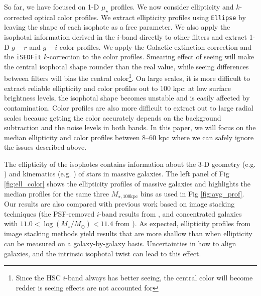 \documentclass[a4paper,fleqn,usenatbib]{mnras}
\def\logms{{$\log (M_{\star}/M_{\odot})$}}
\def\mtot{{$M_{\star,100\mathrm{kpc}}$}}
\def\mden{{$\mu_{\star}$}}
\begin{document}
    So far, we have focused on 1-D \mden{} profiles. 
    We now consider ellipticity and $k$-corrected optical color profiles.
	We extract ellipticity profiles using \texttt{Ellipse} by leaving the shape of 
	each isophote as a free parameter. 
	We also apply the isophotal information derived in the $i$-band directly to other 
	filters and extract 1-D $g-r$ and $g-i$ color profiles.
	We apply the Galactic extinction correction and the \texttt{iSEDFit} $k$-correction 
	to the color profiles. 
	Smearing effect of seeing will make the central isophotal shape rounder than the 
	real value, while seeing differences between filters will bias the central 
	color\footnote{Since the HSC $i$-band always has better seeing, the central color 
	will become redder is seeing effects are not accounted for}. 
	On large scales, it is more difficult to extract reliable ellipticity and 
	color profiles out to 100 kpc: at low surface brightness levels, the isophotal 
	shape becomes unstable and is easily affected by contamination. 
	Color profiles are also more difficult to extract out to large radial scales
	because  getting the color accurately depends on the background subtraction and 
	the noise levels in both bands. 
	In this paper, we will focus on the median ellipticity and color profiles between 
	8--60 kpc where we can safely ignore the issues described above. 
	
	The ellipticity of the isophotes contains information about the 3-D geometry 
	(e.g. \citealt{Tremblay1995, Tremblay1996, Chang2013, RodriguezPadilla2013, 
	Mitsuda2017}) and kinematics (e.g. \citealt{Cappellari2012, Weijmans2014}) of 
	stars in massive galaxies.  
	The left panel of Fig \ref{fig:ell_color} shows the ellipticity profiles of 
	massive galaxies and highlights the median profiles for the same three \mtot{} 
	bins as used in Fig \ref{fig:avg_prof}.  
	Our results are also compared with previous work based on image stacking techniques 
	(the PSF-removed $i$-band results from \citealt{Tal2011}, and
    concentrated galaxies with $11.0<$\logms{}$<11.4$ from \citealt{DSouza2015}).
	As expected, ellipticity profiles from image stacking methods yield results that 
	are more shallow than when ellipticity can be measured on a galaxy-by-galaxy basis.     
	Uncertainties in how to align galaxies, and the intrinsic isophotal twist can 
	lead to this effect. 
\end{document}

